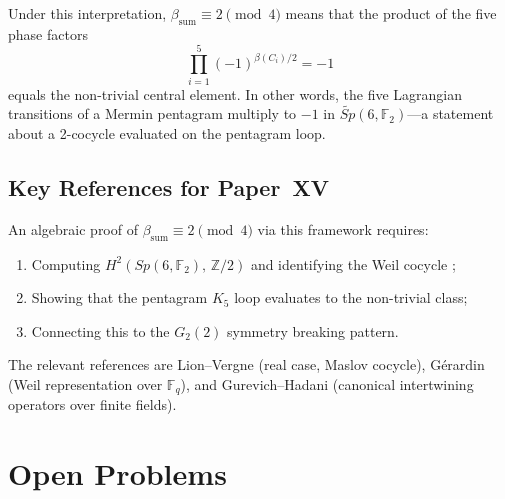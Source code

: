 \documentclass[11pt,a4paper]{article}
\theoremstyle{remark}
\begin{document}
Under this interpretation, $\beta_{\mathrm{sum}} \equiv 2 \pmod 4$ means that
the product of the five phase factors
\[
  \prod_{i=1}^5 (-1)^{\beta(C_i)/2} = -1
\]
equals the non-trivial central element.
In other words, the five Lagrangian transitions of a Mermin pentagram multiply
to $-1$ in $\widetilde{Sp}(6,\mathbb{F}_2)$---a statement about a 2-cocycle
evaluated on the pentagram loop.

\subsection{Key References for Paper~XV}

An algebraic proof of $\beta_{\mathrm{sum}} \equiv 2\pmod 4$ via this framework
requires:
\begin{enumerate}
  \item Computing $H^2(Sp(6,\mathbb{F}_2),\,\mathbb{Z}/2)$ and identifying the
        Weil cocycle \cite{Gerardin};
  \item Showing that the pentagram $K_5$ loop evaluates to the non-trivial
        class;
  \item Connecting this to the $G_2(2)$ symmetry breaking pattern.
\end{enumerate}
The relevant references are Lion--Vergne \cite{LionVergne1980} (real case,
Maslov cocycle), G\'erardin \cite{Gerardin} (Weil representation over
$\mathbb{F}_q$), and Gurevich--Hadani \cite{GurevichHadani} (canonical
intertwining operators over finite fields).


\section{Open Problems}\label{sec:open}
\end{document}
